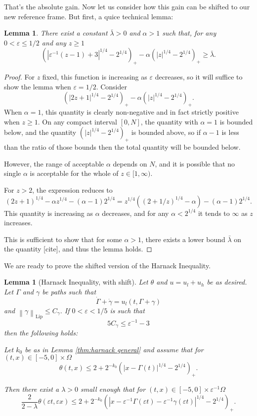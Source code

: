 \documentclass[11pt]{amsart}
\newtheorem{lemma}[theorem]{Lemma}
\theoremstyle{remark}
\theoremstyle{definition}
\newcommand{\eps}{\varepsilon}
\newcommand{\norm}[1]{\left\lVert#1\right\rVert}
\newcommand{\paren}[1]{\left( #1 \right)}
\newcommand{\Lip}{\text{Lip}}
\newcommand{\n}{^{-1}}
\newcommand{\ulow}{u_l}
\newcommand{\uhigh}{u_h}
\begin{document}
That's the absolute gain.  Now let us consider how this gain can be shifted to our new reference frame.  But first, a quice technical lemma:

\begin{lemma} \label{thm:technical scaling of barrier}
There exist a constant $\bar{\lambda} > 0$ and $\alpha > 1$ such that, for any $0 < \eps \leq 1/2$ and any $z \geq 1$
\[ \paren{|\eps\n (z - 1) + 3|^{1/4} - 2^{1/4}}_+ - \alpha \paren{|z|^{1/4} - 2^{1/4}}_+ \geq \bar{\lambda}. \]
\end{lemma}

\begin{proof}
For $z$ fixed, this function is increasing as $\eps$ decreases, so it will suffice to show the lemma when $\eps = 1/2$.  Consider
\[ \paren{|2 z + 1|^{1/4} - 2^{1/4}}_+ - \alpha \paren{|z|^{1/4} - 2^{1/4}}_+. \]
When $\alpha = 1$, this quantity is clearly non-negative and in fact strictly positive when $z \geq 1$.  On any compact interval $[0,N]$, the quantity with $\alpha = 1$ is bounded below, and the quantity $\paren{|z|^{1/4} - 2^{1/4}}_+$ is bounded above, so if $\alpha-1$ is less than the ratio of those bounds then the total quantity will be bounded below.  

However, the range of acceptable $\alpha$ depends on $N$, and it is possible that no single $\alpha$ is acceptable for the whole of $z \in [1,\infty)$.  

For $z > 2$, the expression reduces to
\[ (2z+1)^{1/4} - \alpha z^{1/4} - (\alpha-1) 2^{1/4} = z^{1/4} \paren{(2 + 1/z)^{1/4} - \alpha} - (\alpha-1)2^{1/4}. \]
This quantity is increasing as $\alpha$ decreases, and for any $\alpha < 2^{1/4}$ it tends to $\infty$ as $z$ increases. 

This is sufficient to show that for some $\alpha > 1$, there exists a lower bound $\bar{\lambda}$ on the quantity [cite], and thus the lemma holds. 
\end{proof}

We are ready to prove the shifted version of the Harnack Inequality.  

\begin{lemma}[Harnack Inequality, with shift] \label{thm:harnack shifted}
Let $\theta$ and $u = \ulow + \uhigh$ be as desired.  Let $\Gamma$ and $\gamma$ be paths such that
\[ \dot{\Gamma} + \dot{\gamma} = \ulow(t,\Gamma+\gamma) \]
and $\norm{\gamma}_\Lip \leq C_\gamma$.  If $0 < \eps < 1/5$ is such that
\[ 5 C_\gamma \leq \eps\n - 3 \]
then the following holds:

Let $k_0$ be as in Lemma \ref{thm:harnack general} and assume that for $(t,x) \in [-5,0]\times \Omega$
\[ \theta(t,x) \leq 2 + 2^{-k_0} \paren{|x-\Gamma(t)|^{1/4}-2^{1/4}}_+. \]

Then there exist a $\lambda > 0$ small enough that for $(t,x) \in [-5,0]\times \eps\n \Omega$
\[ \frac{2}{2-\lambda} \theta(\eps t, \eps x) \leq 2 + 2^{-k_0} \paren{|x-\eps\n\Gamma(\eps t)-\eps\n\gamma(\eps t)|^{1/4}-2^{1/4}}_+. \]
\end{lemma}
\end{document}
